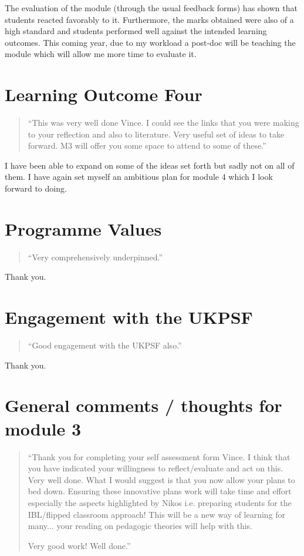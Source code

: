 \documentclass[a4paper,12pt]{article}
\begin{document}
The evaluation of the module (through the usual feedback forms) has shown that students reacted favorably to it. Furthermore, the marks obtained were also of a high standard and students performed well against the intended learning outcomes. This coming year, due to my workload a post-doc will be teaching the module which will allow me more time to evaluate it.

\section{Learning Outcome Four}

\begin{quote}
    ``This was very well done Vince. I could see the links that you were making to your reflection and also to literature. Very useful set of ideas to take forward. M3 will offer you some space to attend to some of these.''
\end{quote}

I have been able to expand on some of the ideas set forth but sadly not on all of them. I have again set myself an ambitious plan for module 4 which I look forward to doing.

\section{Programme Values}

\begin{quote}
    ``Very comprehensively underpinned.''
\end{quote}

Thank you.

\section{Engagement with the UKPSF}

\begin{quote}
    ``Good engagement with the UKPSF also.''
\end{quote}

Thank you.

\section{General comments / thoughts for module 3}

\begin{quote}
    ``Thank you for completing your self assessment form Vince. I think that you have indicated your willingness to reflect/evaluate and act on this. Very well done. What I would suggest is that you now allow your plans to bed down. Ensuring these innovative plans work will take time and effort especially the aspects highlighted by Nikos i.e. preparing students for the IBL/flipped classroom approach! This will be a new way of learning for many... your reading on pedagogic theories will help with this.

    Very good work! Well done.''
\end{quote}
\end{document}
